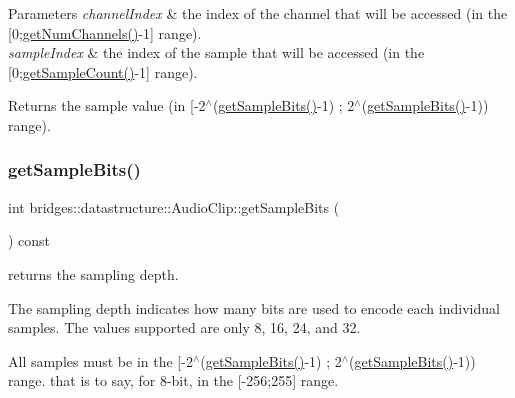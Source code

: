 \begin{DoxyParams}{Parameters}
{\em channel\+Index} & the index of the channel that will be accessed (in the \mbox{[}0;\hyperlink{classbridges_1_1datastructure_1_1_audio_clip_acc378f797b1b6e3cfb778c1ccdc23dba}{get\+Num\+Channels()}-\/1\mbox{]} range). \\
\hline
{\em sample\+Index} & the index of the sample that will be accessed (in the \mbox{[}0;\hyperlink{classbridges_1_1datastructure_1_1_audio_clip_aaaee4b34cd512c02a0c0ea072782a9d6}{get\+Sample\+Count()}-\/1\mbox{]} range). \\
\hline
\end{DoxyParams}
\begin{DoxyReturn}{Returns}
the sample value (in \mbox{[}-\/2$^\wedge$(\hyperlink{classbridges_1_1datastructure_1_1_audio_clip_aca7c5460d005d62a7a0d2eae595e63d3}{get\+Sample\+Bits()}-\/1) ; 2$^\wedge$(\hyperlink{classbridges_1_1datastructure_1_1_audio_clip_aca7c5460d005d62a7a0d2eae595e63d3}{get\+Sample\+Bits()}-\/1)) range). 
\end{DoxyReturn}
\mbox{\label{classbridges_1_1datastructure_1_1_audio_clip_aca7c5460d005d62a7a0d2eae595e63d3}} 
\subsubsection{\texorpdfstring{get\+Sample\+Bits()}{getSampleBits()}}
{\footnotesize\ttfamily int bridges\+::datastructure\+::\+Audio\+Clip\+::get\+Sample\+Bits (\begin{DoxyParamCaption}{ }\end{DoxyParamCaption}) const\hspace{0.3cm}{\ttfamily [inline]}}



returns the sampling depth. 

The sampling depth indicates how many bits are used to encode each individual samples. The values supported are only 8, 16, 24, and 32.

All samples must be in the \mbox{[}-\/2$^\wedge$(\hyperlink{classbridges_1_1datastructure_1_1_audio_clip_aca7c5460d005d62a7a0d2eae595e63d3}{get\+Sample\+Bits()}-\/1) ; 2$^\wedge$(\hyperlink{classbridges_1_1datastructure_1_1_audio_clip_aca7c5460d005d62a7a0d2eae595e63d3}{get\+Sample\+Bits()}-\/1)) range. that is to say, for 8-\/bit, in the \mbox{[}-\/256;255\mbox{]} range.

